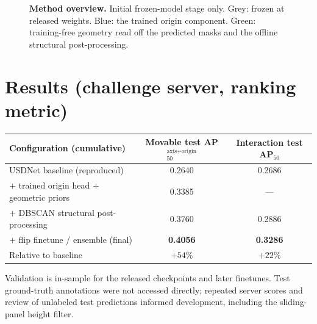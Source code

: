 \documentclass[11pt]{article}
\newcommand{\metric}{AP$_{50}^{\text{axis+origin}}$}
\newcommand{\apfifty}{AP$_{50}$}
\begin{document}
\begin{figure}[h]
{%
}
\caption{\textbf{Method overview.} Initial frozen-model stage only. Grey: frozen at released weights. Blue: the trained origin component. Green: training-free geometry read off the predicted masks and the offline structural post-processing.}
\label{fig:recipe}
\end{figure}

\section*{Results (challenge server, ranking metric)}
\begin{center}
\small
\begin{tabular}{@{}lcc@{}}
\toprule
Configuration (cumulative) & Movable test \metric{} & Interaction test \apfifty{} \\
\midrule
USDNet baseline (reproduced) & 0.2640 & 0.2686 \\
$+$ trained origin head $+$ geometric priors & 0.3385 & --- \\
$+$ DBSCAN structural post-processing & 0.3760 & 0.2886 \\
$+$ flip finetune / ensemble (final) & \textbf{0.4056} & \textbf{0.3286} \\
\midrule
Relative to baseline & $+54\%$ & $+22\%$ \\
\bottomrule
\end{tabular}
\end{center}

\pagebreak
\smallskip
\noindent Validation is in-sample for the released checkpoints and later
finetunes. Test ground-truth annotations were not accessed directly; repeated
server scores and review of unlabeled test predictions informed development,
including the sliding-panel height filter.
\end{document}
